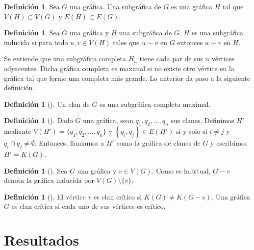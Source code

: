 \documentclass[12pt]{book}
\theoremstyle{definition}
\newtheorem{definition}[theorem]{Definición}
\begin{document}
\begin{definition}
Sea $G$ una gráfica. Una subgráfica de $G$ es una gráfica $H$ tal que $V(H)\subset V(G)$ y $E(H)\subset E(G)$.
\end{definition}

\begin{definition}
Sea $G$ una gráfica y $H$ una subgráfica de $G$. $H$ es una subgráfica inducida si para todo $u,v\in V(H)$ tales que $u\sim v$ en $G$ entonces $u\sim v$ en $H$.
\end{definition}

Se entiende que una subgráfica completa $H_n$ tiene cada par de sus $n$ vértices adyacentes. Dicha gráfica completa es maximal si no existe otro vértice en la gráfica tal que forme una completa más grande. Lo anterior da paso a la siguiente definición.

\begin{definition}[\citealt{Harary:1969}]
Un clan de $G$ es una subgráfica completa maximal. 
\end{definition}

\begin{definition}[\citealt{Roberts:1971}]
Dado $G$ una gráfica, sean $q_1, q_2, \dots, q_n $ sus clanes. Definimos $H'$ mediante $ V(H') = \{q_1, q_2, \dots, q_n\}$ y $\left\{q_i, q_j\right\}\in E(H')$ si y solo si $i \neq j$ y $q_i \cap q_j \neq \emptyset$.  
Entonces, llamamos a $H'$ como la gráfica de clanes de $G$ y escribimos $H'=K(G)$.
\end{definition}

\begin{definition}[\citealt{Alcon:2006}]
Sea $G$ una gráfica y $v \in V(G)$. Como es habitual, $G-v$ denota la gráfica inducida por $V(G)\setminus \{v\}$.  
\end{definition}

\begin{definition}[\citealt{Escalante:1974}]
El vértice $v$ es clan crítico si $K(G)\neq K(G-v)$. Una gráfica $G$ es clan crítica si cada uno de sus vértices es crítico.
\end{definition}



\section{Resultados}
\end{document}
